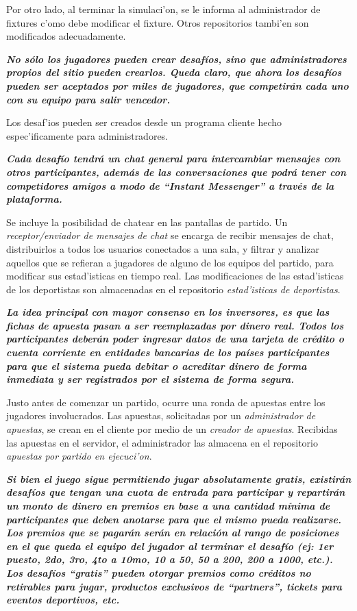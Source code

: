 Por otro lado, al terminar la simulaci'on, se le informa al administrador de fixtures c'omo debe modificar el fixture. Otros repositorios tambi'en son modificados adecuadamente.

\textbf{\textit{No sólo los jugadores pueden crear desafíos, sino que administradores propios del sitio pueden crearlos. Queda claro, que ahora los desafíos pueden ser aceptados por miles de jugadores, que competirán cada uno con su equipo para salir vencedor.}}

Los desaf'ios pueden ser creados desde un programa cliente hecho espec'ificamente para administradores.

\textbf{\textit{
Cada desafío tendrá un chat general para intercambiar mensajes con otros participantes, además de las conversaciones que podrá tener con competidores amigos a modo de ``Instant Messenger'' a través de la plataforma.
}}

Se incluye la posibilidad de chatear en las pantallas de partido. Un \textit{receptor/enviador de mensajes de chat} se encarga de recibir mensajes de chat, distribuirlos a todos los usuarios conectados a una sala, y filtrar y analizar aquellos que se refieran a jugadores de alguno de los equipos del partido, para modificar sus estad'isticas en tiempo real. Las modificaciones de las estad'isticas de los deportistas son almacenadas en el repositorio \textit{estad'isticas de deportistas}.

\textbf{\textit{
La idea principal con mayor consenso en los inversores, es que las fichas de apuesta pasan a ser reemplazadas por dinero real. Todos los participantes deberán poder ingresar datos de una tarjeta de crédito o cuenta corriente en entidades bancarias de los países participantes para que el sistema pueda debitar o acreditar dinero de forma inmediata y ser registrados por el sistema de forma segura.
}}

Justo antes de comenzar un partido, ocurre una ronda de apuestas entre los jugadores involucrados. Las apuestas, solicitadas por un \textit{administrador de apuestas}, se crean en el cliente por medio de un \textit{creador de apuestas}. Recibidas las apuestas en el servidor, el administrador las almacena en el repositorio \textit{apuestas por partido en ejecuci'on}.

\textbf{\textit{
Si bien el juego sigue permitiendo jugar absolutamente gratis, existirán desafíos que tengan una cuota de entrada para participar y repartirán un monto de dinero en premios en base a una cantidad mínima de participantes que deben anotarse para que el mismo pueda realizarse. Los premios que se pagarán serán en relación al rango de posiciones en el que queda el equipo del jugador al terminar el desafío (ej: 1er puesto, 2do, 3ro, 4to a 10mo, 10 a 50, 50 a 200, 200 a 1000, etc.).
Los desafíos “gratis” pueden otorgar premios como créditos no retirables para jugar, productos exclusivos de “partners”, tickets para eventos deportivos, etc.
}}

